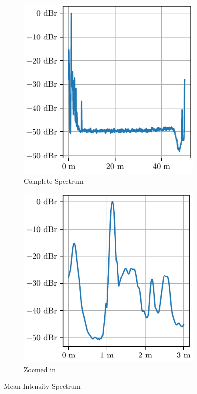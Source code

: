 \begin{figure}
    \centering
    \begin{subfigure}[t]{.45\textwidth}
        \centering
        \includegraphics[width=\textwidth]{../figures/interference.pdf}
        \caption{Complete Spectrum}
    \end{subfigure}
    \begin{subfigure}[t]{.45\textwidth}
        \centering
        \includegraphics[width=\textwidth]{../figures/interference_zoom.pdf}
        \caption{Zoomed in}
    \end{subfigure}
    \caption{Mean Intensity Spectrum}
    \label{fig:avg_intensity}
\end{figure}
